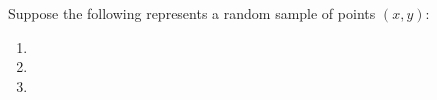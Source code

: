 Suppose the following represents a random sample of points $(x,y)$:

\begin{enumerate}[label={(\alph*)}]
    \item 
    \item \vspace{1in}
    \item 
\end{enumerate}